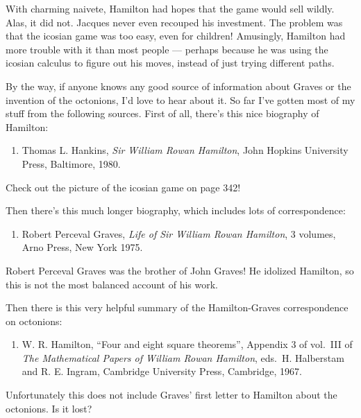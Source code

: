 \documentclass{article}
\def\tightlist{}
\begin{document}
With charming naivete, Hamilton had hopes that the game would sell
wildly. Alas, it did not. Jacques never even recouped his investment.
The problem was that the icosian game was too easy, even for children!
Amusingly, Hamilton had more trouble with it than most people ---
perhaps because he was using the icosian calculus to figure out his
moves, instead of just trying different paths.

By the way, if anyone knows any good source of information about Graves
or the invention of the octonions, I'd love to hear about it. So far
I've gotten most of my stuff from the following sources. First of all,
there's this nice biography of Hamilton:

\begin{enumerate}
\def\labelenumi{\arabic{enumi})}
\setcounter{enumi}{2}
\tightlist
\item
  Thomas L. Hankins, \emph{Sir William Rowan Hamilton}, John Hopkins
  University Press, Baltimore, 1980.
\end{enumerate}

Check out the picture of the icosian game on page 342!

Then there's this much longer biography, which includes lots of
correspondence:

\begin{enumerate}
\def\labelenumi{\arabic{enumi})}
\setcounter{enumi}{3}
\tightlist
\item
  Robert Perceval Graves, \emph{Life of Sir William Rowan Hamilton}, 3
  volumes, Arno Press, New York 1975.
\end{enumerate}

Robert Perceval Graves was the brother of John Graves! He idolized
Hamilton, so this is not the most balanced account of his work.

Then there is this very helpful summary of the Hamilton-Graves
correspondence on octonions:

\begin{enumerate}
\def\labelenumi{\arabic{enumi})}
\setcounter{enumi}{4}
\tightlist
\item
  W. R. Hamilton, ``Four and eight square theorems'', Appendix 3 of
  vol.~III of \emph{The Mathematical Papers of William Rowan Hamilton},
  eds.~H. Halberstam and R. E. Ingram, Cambridge University Press,
  Cambridge, 1967.
\end{enumerate}

Unfortunately this does not include Graves' first letter to Hamilton
about the octonions. Is it lost?
\end{document}
